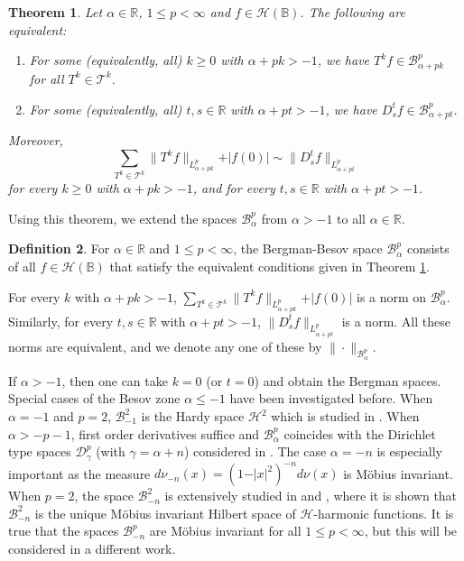 \documentclass{amsart}
\newtheorem{theorem}{Theorem}[section]
\theoremstyle{definition}
\newtheorem{definition}[theorem]{Definition}
\theoremstyle{remark}
\begin{document}
\begin{theorem}\label{TBesov}
Let $\alpha\in\mathbb R$, $1\le p<\infty$ and $f\in\mathcal H(\mathbb B)$.
The following are equivalent:
\begin{enumerate}
  \item[(a)] For some (equivalently, all) $k\ge 0$ with $\alpha+pk>-1$,
  we have $T^k f\in \mathcal B^p_{\alpha+pk}$ for all $T^k\in\mathcal T^k$.
  \item[(b)] For some (equivalently, all) $t,s\in\mathbb R$ with $\alpha+pt>-1$,
  we have $D^t_s f\in \mathcal B^p_{\alpha+pt}$.
\end{enumerate}
Moreover,
\begin{equation*}
\sum_{T^k\in\mathcal T^k} \|T^k f\|_{L^p_{\alpha+pk}}+\vert f(0)\vert
\sim \|D^t_s f\|_{L^p_{\alpha+pt}}
\end{equation*}
for every $k\ge 0$ with $\alpha+pk>-1$, and for every $t,s\in\mathbb R$
with $\alpha+pt>-1$.
\end{theorem}

Using this theorem, we extend the spaces $\mathcal B^p_\alpha$ from $\alpha>-1$
to all $\alpha\in\mathbb R$.

\begin{definition}\label{DBesov}
For $\alpha\in\mathbb R$ and $1\le p<\infty$, the Bergman-Besov space
$\mathcal B^p_\alpha$ consists of all $f\in\mathcal H(\mathbb B)$ that satisfy
the equivalent conditions given in Theorem \ref{TBesov}.
\end{definition}

For every $k$ with $\alpha+pk>-1$,
$\sum_{T^k\in\mathcal T^k} \|T^k f\|_{L^p_{\alpha+pk}}+\vert f(0)\vert$
is a norm on $\mathcal B^p_\alpha$.
Similarly, for  every $t,s\in\mathbb R$ with $\alpha+pt>-1$,
$\|D^t_s f\|_{L^p_{\alpha+pt}}$ is a norm.
All these norms are equivalent, and we denote any one of these
by $\|\cdot\|_{\mathcal  B^p_\alpha}$.

If $\alpha>-1$, then one can take $k=0$ (or $t=0$) and obtain the Bergman spaces.
Special cases of the Besov zone $\alpha\le -1$ have been investigated before.
When $\alpha=-1$ and $p=2$, $\mathcal B^2_{-1}$ is the Hardy space
$\mathcal H^2$ which is studied in \cite{St2}.
When $\alpha>-p-1$, first order derivatives suffice and
$\mathcal B^p_\alpha$ coincides with the Dirichlet type spaces
$\mathcal D^p_\gamma$ (with $\gamma=\alpha+n$) considered
in \cite[Chapter 10]{St1}.
The case $\alpha=-n$ is especially important as the measure
$d\nu_{-n}(x)=(1-\vert x\vert^2)^{-n}d\nu(x)$ is M\"obius invariant.
When $p=2$, the space $\mathcal B^2_{-n}$ is extensively studied in
\cite{BEY} and \cite{BE}, where it is shown that $\mathcal B^2_{-n}$ is the unique
M\"obius invariant Hilbert space of $\mathcal H$-harmonic functions.
It is true that the spaces $\mathcal B^p_{-n}$ are M\"obius
invariant for all $1\le p<\infty$, but this will be considered in a
different work.
\end{document}
